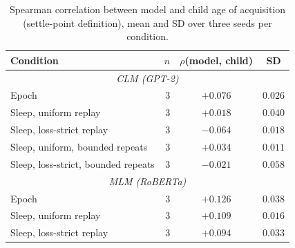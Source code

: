 \begin{table}[t]
\centering
\small
\begin{tabular}{lrcc}
\toprule
Condition & $n$ & $\rho$(model, child) & SD \\
\midrule
\multicolumn{4}{c}{\emph{CLM (GPT-2)}} \\
Epoch & 3 & $+0.076$ & $0.026$ \\
Sleep, uniform replay & 3 & $+0.018$ & $0.040$ \\
Sleep, loss-strict replay & 3 & $-0.064$ & $0.018$ \\
Sleep, uniform, bounded repeats & 3 & $+0.034$ & $0.011$ \\
Sleep, loss-strict, bounded repeats & 3 & $-0.021$ & $0.058$ \\
\multicolumn{4}{c}{\emph{MLM (RoBERTa)}} \\
Epoch & 3 & $+0.126$ & $0.038$ \\
Sleep, uniform replay & 3 & $+0.109$ & $0.016$ \\
Sleep, loss-strict replay & 3 & $+0.094$ & $0.033$ \\
\bottomrule
\end{tabular}
\caption{Spearman correlation between model and child age of acquisition (settle-point definition), mean and SD over three seeds per condition.}
\label{tab:aoa}
\end{table}
